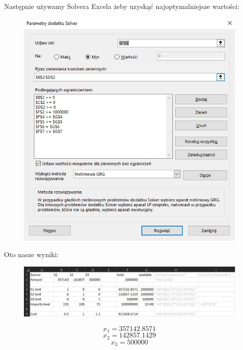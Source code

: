 \documentclass{article}
\begin{document}
Następnie używamy Solvera Excela żeby uzyskąć najoptymalniejsze wartości:

\begin{figure}[h!]
    \centering
    \includegraphics[scale=0.75]{solver.jpg}
\end{figure}

\newpage

Oto nasze wyniki:

\begin{figure}[h!]
    \hspace{-6em}
    \includegraphics[scale=0.5]{arkusz.jpg}
\end{figure}

$$
    x_{1} = 357142.8571
$$
$$
    x_{2} = 142857.1429
$$
$$
    x_{3} = 500000
$$
\end{document}
